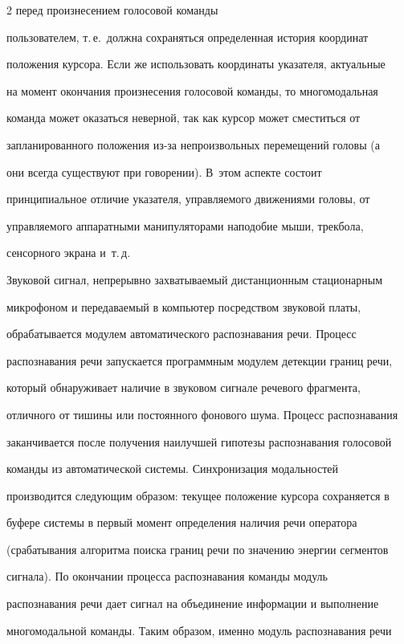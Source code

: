 \begin{multicols}{2}
 перед произнесением голосовой команды 


пользователем, т.\,е.\ должна сохраняться определенная история координат 


положения курсора. Если же использовать координаты указателя, актуальные 


на момент окончания произнесения голосовой команды, то многомодальная 


команда может оказаться неверной, так как курсор может сместиться от 


запланированного положения из-за непроизвольных перемещений головы (а 


они всегда существуют при говорении). В~этом аспекте состоит 


принципиальное отличие указателя, управляемого движениями головы, от 


управляемого аппаратными манипуляторами наподобие мыши, трекбола, 


сенсорного экрана и~т.\,д.


  


  Звуковой сигнал, непрерывно захватываемый дистанционным стационарным 


микрофоном и передаваемый в компьютер посредством звуковой платы, 


обрабатывается модулем автоматического распознавания речи. Процесс 


распознавания речи запускается программным модулем детекции границ речи, 


который обнаруживает наличие в звуковом сигнале речевого фрагмента, 


отличного от тишины или постоянного фонового шума. Процесс распознавания 


заканчивается после получения наилучшей гипотезы распознавания голосовой 


команды из автоматической системы. Синхронизация модальностей 


производится следующим образом: текущее положение курсора сохраняется в 


буфере системы в первый момент определения наличия речи оператора 


(срабатывания алгоритма поиска границ речи по значению энергии сегментов 


сигнала). По окончании процесса распознавания команды модуль 


распознавания речи дает сигнал на объединение информации и выполнение 


многомодальной команды. Таким образом, именно модуль распознавания речи 



\end{multicols}
